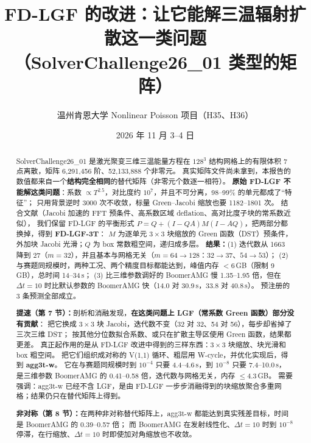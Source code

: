 \documentclass[11pt,a4paper]{ctexart}
\title{FD-LGF 的改进：让它能解三温辐射扩散这一类问题\\（SolverChallenge26\_01 类型的矩阵）}
\author{温州肯恩大学 \quad Nonlinear Poisson 项目（H35、H36）}
\date{2026 年 11 月 3--4 日}
\begin{document}
\maketitle

\begin{abstract}
SolverChallenge26\_01 是激光聚变三维三温能量方程在 $128^3$ 结构网格上的有限体积 7 点离散，矩阵 6,291,456 阶、52,133,888 个非零元。
真实矩阵文件尚未拿到，本报告的数值都来自一个\textbf{结构完全相同}的替代矩阵（非零元个数逐一相符）。
\textbf{原始 FD-LGF 不能解这类问题}：系数 $\propto T^{2.5}$，对比度约 $10^{7}$，并且不可分离，98--99\% 的单元都成了“特征”；
只用背景逆时 3000 次不收敛，标量 Green--Jacobi 缩放也要 1182--1801 次。
结合文献（Jacobi 加速的 FFT 预条件、高系数区域 deflation、高对比度子块的常系数近似），
我们保留 FD-LGF 的平衡形式 $P=Q+(I-QA)M(I-AQ)$，把两部分都换掉，得到 \textbf{FD-LGF-3T}：
$M$ 为逐单元 $3\times3$ 块缩放的 Green 函数（DST）预条件，外加块 Jacobi 光滑；$Q$ 为 box 常数粗空间，递归成多层。
\textbf{结果：}(1) 迭代数从 1663 降到 27（$m=32$），并且基本与网格无关（$m=64\to128$：$32\to37$、$54\to53$）；
(2) 与赛题同规模时，两种工况、两个精度目标都能达到，峰值内存 $<6$\,GB（限制 9\,GB），总时间 14--34\,s；
(3) 比三维参数调好的 BoomerAMG 慢 1.35--1.95 倍，但在 $\Delta t=10$ 时比默认参数的 BoomerAMG 快（14.0 对 30.9\,s，33.8 对 40.8\,s）。
预注册的 3 条预测全部成立。

\textbf{提速（第 7 节）：}剖析和消融发现，\textbf{在这类问题上 LGF（常系数 Green 函数）部分没有贡献}：
把它换成 $3\times3$ 块 Jacobi，迭代数不变（32 对 32、54 对 56），每步却省掉了三次三维 DST；
按其他分位数拟合系数、或只在扩散主导区使用 Green 函数，结果都更差。
真正起作用的是从 FD-LGF 改进中得到的三样东西：$3\times3$ 块缩放、块光滑和 box 粗空间。
把它们组织成对称的 V(1,1) 循环、粗层用 W-cycle，并优化实现后，得到 \textbf{agg3t-w}。
它在与赛题同规模时到 $10^{-4}$ 只要 4.4--4.6\,s，到 $10^{-8}$ 只要 7.4--10.0\,s，
是三维参数 BoomerAMG 的 0.41--0.58 倍，迭代数与网格无关，内存 $\le4.3$\,GB。
需要强调：agg3t-w 已经不含 LGF，是由 FD-LGF 一步步消融得到的块缩放聚合多重网格；结果仍只在替代矩阵上得到。

\textbf{非对称（第 8 节）：}在两种非对称替代矩阵上，agg3t-w 都能达到真实残差目标，时间是 BoomerAMG 的 0.39--0.57 倍；
而 BoomerAMG 在发射线性化、$\Delta t=10$ 时到 $10^{-8}$ 停滞，在行缩放、$\Delta t=10$ 时即使加对角缩放也不收敛。
\end{abstract}

\tableofcontents
\end{document}
